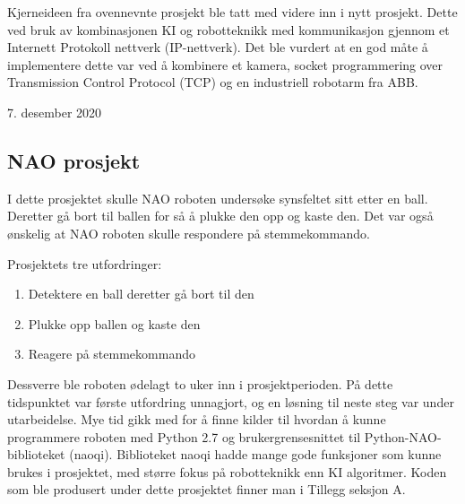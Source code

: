 \documentclass[conference]{IEEEtran}
\begin{document}
Kjerneideen fra ovennevnte prosjekt ble tatt med videre inn i nytt prosjekt. Dette ved bruk av kombinasjonen KI og robotteknikk med kommunikasjon 
gjennom et Internett Protokoll nettverk (IP-nettverk). Det ble vurdert at en god måte å implementere dette var ved å kombinere et kamera, socket 
programmering over Transmission Control Protocol  (TCP) og en industriell robotarm fra ABB.
 
\hfill 7. desember 2020

    \subsection{NAO prosjekt}
    I dette prosjektet skulle NAO roboten undersøke synsfeltet sitt etter en ball. Deretter gå bort til ballen for så å plukke den opp og kaste den. 
    Det var også ønskelig at NAO roboten skulle respondere på stemmekommando. 

        Prosjektets tre utfordringer:
        \begin{enumerate}
            \item Detektere en ball deretter gå bort til den 
            \item Plukke opp ballen og kaste den
            \item Reagere på stemmekommando 
        \end{enumerate}
        
        Dessverre ble roboten ødelagt to uker inn i prosjektperioden. På dette tidspunktet var første utfordring unnagjort, 
        og en løsning til neste steg var under utarbeidelse. Mye tid gikk med for å finne kilder til hvordan å kunne programmere roboten med Python 2.7 
        og brukergrensesnittet til Python-NAO-biblioteket (naoqi). Biblioteket naoqi hadde mange gode funksjoner som kunne brukes i prosjektet, med 
        større fokus på robotteknikk enn KI algoritmer. Koden som ble produsert under dette prosjektet finner man i Tillegg seksjon A.
\end{document}
